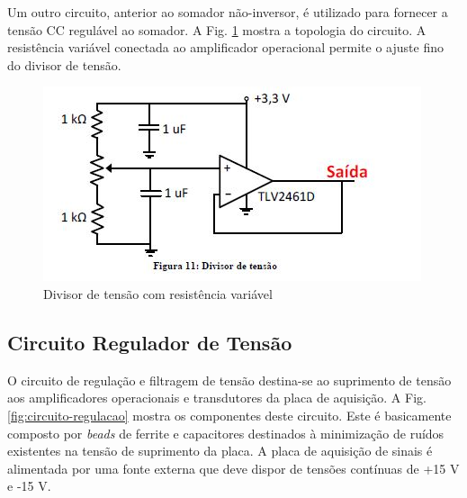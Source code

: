 Um outro circuito, anterior ao somador não-inversor, é utilizado para fornecer a tensão CC regulável ao somador.
A Fig. \ref{fig:divisor-tensao} mostra a topologia do circuito. A resistência variável conectada ao amplificador operacional permite o ajuste fino do divisor de tensão.

\begin{figure}[!hbt]
	\begin{center}
		\includegraphics[scale=0.7]{figuras/divisor-tensao.JPG}
		\caption{Divisor de tensão com resistência variável}
		\label{fig:divisor-tensao}
	\end{center}
\end{figure}

\subsection{Circuito Regulador de Tensão}

O circuito de regulação e filtragem de tensão destina-se ao suprimento de tensão aos amplificadores operacionais e transdutores da placa de aquisição. A Fig. \ref{fig:circuito-regulacao} mostra os componentes deste circuito. Este é basicamente composto por \textit{beads} de ferrite e capacitores destinados à minimização de ruídos existentes na tensão de suprimento da placa. A placa de aquisição de sinais é alimentada por uma fonte externa que deve dispor de tensões contínuas de +15 V e -15 V.

